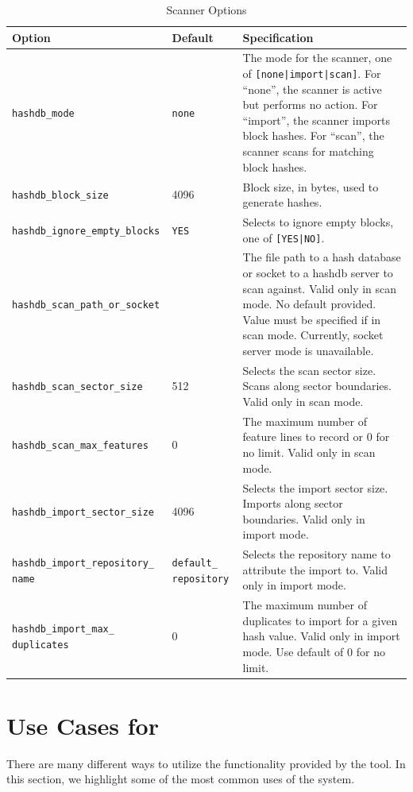 \documentclass[11pt,fleqn]{article} %
\begin{document}
\begin{table}[!ht]

\centering
\caption{\bulk \hdb Scanner Options}
\label{tab:hashdb_be_usage}
\begin{tabular}{|p{5 cm}|p{2.0 cm}|p{6.5 cm}|}
\hline \hline
\textbf{Option} & \textbf{Default} & \textbf{Specification} \\
\hline
\verb+hashdb_mode+ & \verb+none+ & The mode for the scanner, one of \verb+[none|import|scan]+. For ``none'', the scanner is active but performs no action. For ``import'', the scanner imports block hashes. For ``scan'', the scanner scans for matching block hashes.\\
\hline
\verb+hashdb_block_size+ &4096 & Block size, in bytes, used to generate hashes.\\
\hline
\verb+hashdb_ignore_empty_blocks+ & \verb+YES+ &Selects to ignore empty blocks,  one of \verb+[YES|NO]+.\\
\hline
\verb+hashdb_scan_path_or_socket+ & & The file path to a hash database or socket to a hashdb server to scan against.  Valid only in scan mode. No default provided. Value must be specified if in scan mode.  Currently, socket server mode is unavailable.\\
\hline
\verb+hashdb_scan_sector_size+ & 512 &Selects the scan sector size.  Scans along sector boundaries.  Valid only in scan mode.\\
\hline
\verb+hashdb_scan_max_features+ & 0 &The maximum number of feature lines to record or 0 for no limit.  Valid only in scan mode.\\
\hline
\verb+hashdb_import_sector_size+ & 4096 & Selects the import sector size.  Imports along sector boundaries.  Valid only in import mode.\\
\hline
\verb+hashdb_import_repository_+ \verb+name+ & \verb+default_+ \verb+repository+ &Selects the repository name to attribute the import to.  Valid only in import mode.\\
\hline
\verb+hashdb_import_max_+ \verb+duplicates+ & 0 &The maximum number of duplicates to import for a given hash value.  Valid only in import mode. Use default of 0 for no limit.\\
\hline
\end{tabular}
\end{table}

\section{Use Cases for \hdb}
\label{UseCases}
There are many different ways to utilize the functionality provided by the \hdb tool. In this section, we highlight some of the most common uses of the system.
\end{document}
